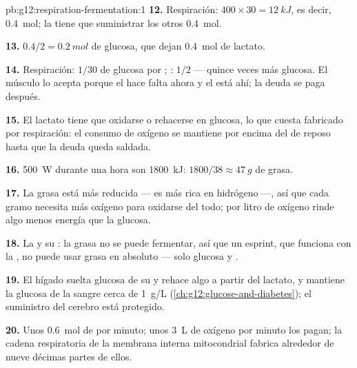 \begin{solution}{pb:g12:respiration-fermentation:1}
\textbf{12.} Respiración: $400 \times 30 = \qty{12}{kJ}$, es decir,
\qty{0.4}{mol}; la  tiene que suministrar los otros
\qty{0.4}{mol}.

\textbf{13.} $0.4/2 = \qty{0.2}{mol}$ de glucosa, que dejan
\qty{0.4}{mol} de lactato.

\textbf{14.} Respiración: $1/30$ de glucosa por ; :
$1/2$ --- quince veces más glucosa. El músculo lo acepta porque el 
hace falta ahora y el  está ahí; la deuda se paga después.

\textbf{15.} El lactato tiene que oxidarse o rehacerse en glucosa, lo
que cuesta  fabricado por respiración: el consumo de oxígeno se
mantiene por encima del de reposo hasta que la deuda queda saldada.

\textbf{16.} \qty{500}{W} durante una hora son \qty{1800}{kJ}: $1800/38
\approx \qty{47}{g}$ de grasa.

\textbf{17.} La grasa está más reducida --- es más rica en hidrógeno
---, así que cada gramo necesita más oxígeno para oxidarse del todo;
por litro de oxígeno rinde algo menos energía que la glucosa.

\textbf{18.} La  y su : la grasa no se puede
fermentar, así que un esprint, que funciona con la , no
puede usar grasa en absoluto --- solo glucosa y .

\textbf{19.} El hígado suelta glucosa de su  y rehace algo a
partir del lactato, y mantiene la glucosa de la sangre cerca de
\qty{1}{g/L} (\cref{ch:g12:glucose-and-diabetes}); el suministro del
cerebro está protegido.

\textbf{20.} Unos \qty{0.6}{mol} de  por minuto; unos \qty{3}{L} de
oxígeno por minuto los pagan; la cadena respiratoria de la membrana
interna mitocondrial fabrica alrededor de nueve décimas partes de
ellos.
\end{solution}
